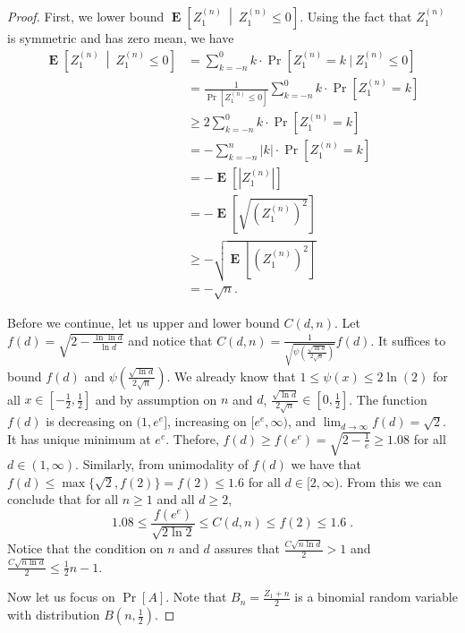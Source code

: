 \documentclass{article}
\DeclareMathOperator*{\Exp}{\mathbf{E}}
\begin{document}
\begin{proof}
First, we lower bound $\Exp \left[ Z^{(n)}_1 ~\middle|~ Z^{(n)}_1 \le 0 \right]$. Using the fact that $Z^{(n)}_1$ is symmetric and has zero mean, we have
\begin{align*}
\Exp \left[ Z^{(n)}_1 ~\middle|~ Z^{(n)}_1 \le 0 \right]
& = \sum_{k=-n}^0 k \cdot \Pr[Z^{(n)}_1 = k ~|~ Z^{(n)}_1 \le 0] \\
& = \frac{1}{\Pr[Z^{(n)}_1 \le 0]} \sum_{k=-n}^0 k \cdot \Pr[Z^{(n)}_1 = k] \\
& \ge 2 \sum_{k=-n}^0 k \cdot \Pr[Z^{(n)}_1 = k] \\
& = - \sum_{k=-n}^n |k| \cdot \Pr[Z^{(n)}_1 = k] \\
& = - \Exp[|Z^{(n)}_1|] \\
& = - \Exp \left[ \sqrt{ \left( Z^{(n)}_1 \right)^2} \right] \\
& \ge - \sqrt{\Exp \left[ \left( Z^{(n)}_1 \right)^2 \right]} \\
& = -\sqrt{n}.
\end{align*}


Before we continue, let us upper and lower bound $C(d,n)$. Let
$f(d)=\sqrt{2-\frac{\ln \ln d}{\ln d}}$ and notice that $C(d,n) =
\frac{1}{\sqrt{\psi\left( \frac{\sqrt{\ln d}}{2 \sqrt{n}}\right)}} f(d)$.  It
suffices to bound $f(d)$ and $\psi( \frac{\sqrt{\ln d}}{2 \sqrt{n}})$.
We already know that $1 \le \psi(x) \le 2 \ln(2)$ for all $x \in [-\frac{1}{2}, \frac{1}{2}]$
and by assumption on $n$ and $d$, $\frac{\sqrt{\ln d}}{2\sqrt{n}} \in [0,\frac{1}{2}]$.
The function $f(d)$ is decreasing on $(1,e^e]$,
increasing on $[e^e, \infty)$, and $\lim_{d \to \infty} f(d) = \sqrt{2}$. It has
unique minimum at $e^e$. Thefore, $f(d) \ge f(e^e) = \sqrt{2 - \frac{1}{e}} \ge 1.08$
for all $d \in (1,\infty)$.  Similarly, from unimodality of $f(d)$ we have that
$f(d) \le \max\{\sqrt{2}, f(2)\} = f(2) \le 1.6$ for all $d \in [2, \infty)$.
From this we can conclude that for all $n \ge 1$ and all $d \ge 2$,
$$
1.08 \le \frac{f(e^e)}{\sqrt{2 \ln 2}} \le C(d,n) \le f(2)\le 1.6 \; .
$$
Notice that the condition on $n$ and $d$ assures that $\frac{C \sqrt{n \ln d}}{2}>1$ and $\frac{C \sqrt{n \ln d}}{2}\le \frac{1}{2} n - 1$.

Now let us focus on $\Pr[A]$. Note that $B_n = \frac{Z_1 + n}{2}$ is a binomial random variable with distribution $B(n,\frac{1}{2})$.


\end{proof}
\end{document}
